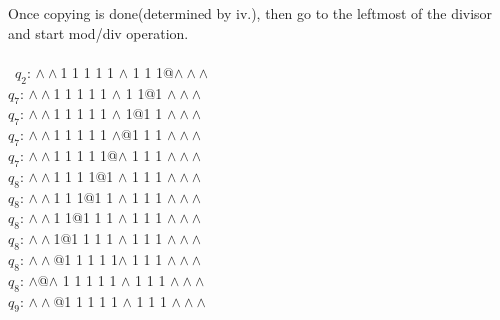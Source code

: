 \documentclass[a4paper]{article} %
\begin{document}
\begin{center}
\begin{varwidth}{\textwidth}
\begin{tasks}[label={(\roman*)},label-width={0.5cm}]
            \task Once copying is done(determined by iv.), then go to the leftmost of the divisor and start mod/div operation.\\\\\
            $q_2$: $\land\land$1 1 1 1 1 $\land$ 1 1 1@$\land\land\land$\\
            $q_7$: $\land\land$1 1 1 1 1 $\land$ 1 1@1 $\land\land\land$\\
            $q_7$: $\land\land$1 1 1 1 1 $\land$ 1@1 1 $\land\land\land$\\
            $q_7$: $\land\land$1 1 1 1 1 $\land$@1 1 1 $\land\land\land$\\
            $q_7$: $\land\land$1 1 1 1 1@$\land$ 1 1 1 $\land\land\land$\\
            $q_8$: $\land\land$1 1 1 1@1 $\land$ 1 1 1 $\land\land\land$\\
            $q_8$: $\land\land$1 1 1@1 1 $\land$ 1 1 1 $\land\land\land$\\
            $q_8$: $\land\land$1 1@1 1 1 $\land$ 1 1 1 $\land\land\land$\\
            $q_8$: $\land\land$1@1 1 1 1 $\land$ 1 1 1 $\land\land\land$\\
            $q_8$: $\land\land$@1 1 1 1 1$\land$ 1 1 1 $\land\land\land$\\
            $q_8$: $\land$@$\land$ 1 1 1 1 1 $\land$ 1 1 1 $\land\land\land$\\
            $q_9$: $\land\land$@1 1 1 1 1 $\land$ 1 1 1 $\land\land\land$
        \end{tasks}
        \end{varwidth}
    \end{center}
\end{document}
